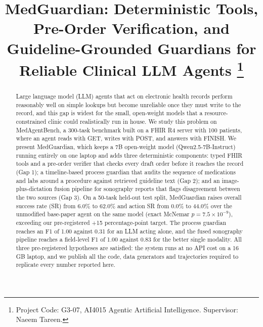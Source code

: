 \documentclass[conference]{IEEEtran}
\begin{document}

\title{MedGuardian: Deterministic Tools, Pre-Order Verification, and Guideline-Grounded Guardians for Reliable Clinical LLM Agents%
\thanks{Project Code: G3-07, AI4015 Agentic Artificial Intelligence. Supervisor: Naeem Tareen.}}

\author{
\and
{}
}

\maketitle

\begin{abstract}
Large language model (LLM) agents that act on electronic health records perform reasonably well on simple lookups but become unreliable once they must write to the record, and this gap is widest for the small, open-weight models that a resource-constrained clinic could realistically run in house. We study this problem on MedAgentBench, a 300-task benchmark built on a FHIR R4 server with 100 patients, where an agent reads with GET, writes with POST, and answers with FINISH. We present MedGuardian, which keeps a 7B open-weight model (Qwen2.5-7B-Instruct) running entirely on one laptop and adds three deterministic components: typed FHIR tools and a pre-order verifier that checks every draft order before it reaches the record (Gap 1); a timeline-based process guardian that audits the sequence of medications and labs around a procedure against retrieved guideline text (Gap 2); and an image-plus-dictation fusion pipeline for sonography reports that flags disagreement between the two sources (Gap 3). On a 50-task held-out test split, MedGuardian raises overall success rate (SR) from 6.0\% to 62.0\% and action SR from 0.0\% to 44.0\% over the unmodified base-paper agent on the same model (exact McNemar $p=7.5\times10^{-9}$), exceeding our pre-registered +15 percentage-point target. The process guardian reaches an F1 of 1.00 against 0.31 for an LLM acting alone, and the fused sonography pipeline reaches a field-level F1 of 1.00 against 0.83 for the better single modality. All three pre-registered hypotheses are satisfied: the system runs at no API cost on a 16 GB laptop, and we publish all the code, data generators and trajectories required to replicate every number reported here.
\end{abstract}
\end{document}
